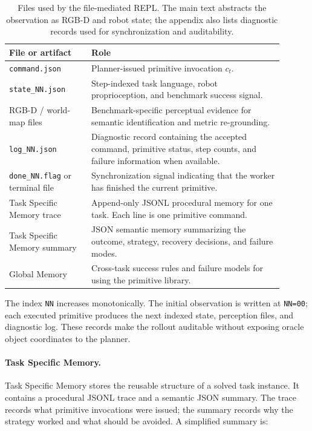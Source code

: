 \documentclass[11pt]{article}
\begin{document}
  \begin{table}[h]
  \centering
  \caption{Files used by the file-mediated REPL. The main text abstracts the observation
  as RGB-D and robot state; the appendix also lists diagnostic records used for
  synchronization and auditability.}
  \label{tab:app_repl_files}
  \small
  \setlength{\tabcolsep}{4pt}
  \begin{tabular}{p{0.27\linewidth}p{0.63\linewidth}}
  \toprule
  File or artifact & Role \\
  \midrule
  \texttt{command.json} &
  Planner-issued primitive invocation $c_t$. \\
  \texttt{state\_NN.json} &
  Step-indexed task language, robot proprioception, and benchmark success signal. \\
  RGB-D / world-map files &
  Benchmark-specific perceptual evidence for semantic identification and metric
  re-grounding. \\
  \texttt{log\_NN.json} &
  Diagnostic record containing the accepted command, primitive status, step counts, and
  failure information when available. \\
  \texttt{done\_NN.flag} or terminal file &
  Synchronization signal indicating that the worker has finished the current primitive. \\
  Task Specific Memory trace &
  Append-only JSONL procedural memory for one task. Each line is one primitive command. \\
  Task Specific Memory summary &
  JSON semantic memory summarizing the outcome, strategy, recovery decisions, and
  failure modes. \\
  Global Memory &
  Cross-task success rules and failure models for using the primitive library. \\
  \bottomrule
  \end{tabular}
  \end{table}

  The index \texttt{NN} increases monotonically. The initial observation is written at
  \texttt{NN=00}; each executed primitive produces the next indexed state, perception
  files, and diagnostic log. These records make the rollout auditable without exposing
  oracle object coordinates to the planner.

  \paragraph{Task Specific Memory.}
  Task Specific Memory stores the reusable structure of a solved task instance. It
  contains a procedural JSONL trace and a semantic JSON summary. The trace records what
  primitive invocations were issued; the summary records why the strategy worked and
  what should be avoided. A simplified summary is:
\end{document}
